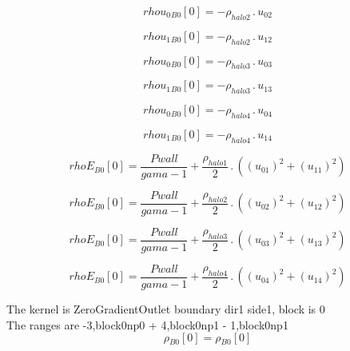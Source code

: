 \documentclass{article}
\begin{document}
\begin{dmath}{rhou_{0}{_{B0}}}[{0}] = - \rho_{halo 2} \,.\, u_{02}\end{dmath}

\begin{dmath}{rhou_{1}{_{B0}}}[{0}] = - \rho_{halo 2} \,.\, u_{12}\end{dmath}

\begin{dmath}{rhou_{0}{_{B0}}}[{0}] = - \rho_{halo 3} \,.\, u_{03}\end{dmath}

\begin{dmath}{rhou_{1}{_{B0}}}[{0}] = - \rho_{halo 3} \,.\, u_{13}\end{dmath}

\begin{dmath}{rhou_{0}{_{B0}}}[{0}] = - \rho_{halo 4} \,.\, u_{04}\end{dmath}

\begin{dmath}{rhou_{1}{_{B0}}}[{0}] = - \rho_{halo 4} \,.\, u_{14}\end{dmath}

\begin{dmath}{rhoE{_{B0}}}[{0}] = \frac{Pwall}{gama - 1} + \frac{\rho_{halo 1}}{2} \,.\, \left(\left(u_{01} \right)^{2} + \left(u_{11} \right)^{2}\right)\end{dmath}

\begin{dmath}{rhoE{_{B0}}}[{0}] = \frac{Pwall}{gama - 1} + \frac{\rho_{halo 2}}{2} \,.\, \left(\left(u_{02} \right)^{2} + \left(u_{12} \right)^{2}\right)\end{dmath}

\begin{dmath}{rhoE{_{B0}}}[{0}] = \frac{Pwall}{gama - 1} + \frac{\rho_{halo 3}}{2} \,.\, \left(\left(u_{03} \right)^{2} + \left(u_{13} \right)^{2}\right)\end{dmath}

\begin{dmath}{rhoE{_{B0}}}[{0}] = \frac{Pwall}{gama - 1} + \frac{\rho_{halo 4}}{2} \,.\, \left(\left(u_{04} \right)^{2} + \left(u_{14} \right)^{2}\right)\end{dmath}

\noindent The kernel is ZeroGradientOutlet boundary dir1 side1, block is 0\\\noindent The ranges are -3,block0np0 + 4,block0np1 - 1,block0np1\\\begin{dmath}{\rho{_{B0}}}[{0}] = {\rho{_{B0}}}[{0}]\end{dmath}
\end{document}
